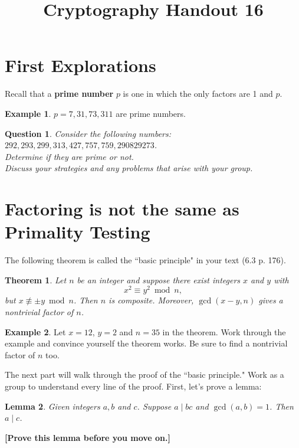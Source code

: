\documentclass[12pt]{amsart}
\makeatletter
\def\subtitle#1{\gdef\@subtitle{#1}}
\def\@subtitle{}
\theoremstyle{plain}
\newtheorem{thm}{Theorem}
\newtheorem{lem}[thm]{Lemma}
\newtheorem{quest}{Question}
\theoremstyle{definition}
\newtheorem*{ex}{Example}
\theoremstyle{remark}
\makeatother
\begin{document}
\onehalfspacing

\title[]{Cryptography Handout 16}
\subtitle{Primality Testing}
\maketitle

\section{First Explorations}
Recall that a \textbf{prime number} $p$ is one in which the only factors are 1 and $p$.

\begin{ex}
$p = 7, 31, 73, 311$ are prime numbers.
\end{ex}

\begin{quest}
Consider the following numbers: $292, 293, 299, 313, 427, 757, 759, 290829273$.\\
Determine if they are prime or not.\\
Discuss your strategies and any problems that arise with your group.
\end{quest}


\newpage \section{Factoring is not the same as Primality Testing}
\noindent The following theorem is called the ``basic principle" in your text (6.3 p. 176).
\begin{thm}
Let $n$ be an integer and suppose there exist integers $x$ and $y$ with $$x^2 \equiv y^2 \bmod n,$$ but $x \not\equiv \pm y \bmod n$.  Then $n$ is composite.  Moreover, $\gcd(x-y,n)$ gives a nontrivial factor of $n$.
\end{thm}

\begin{ex}
Let $x = 12$, $y = 2$ and $n = 35$ in the theorem.  Work through the example and convince yourself the theorem works.  Be sure to find a nontrivial factor of $n$ too.\\ \vspace{2in}
\end{ex}

The next part will walk through the proof of the ``basic principle."  Work as a group to understand every line of the proof.  First, let's prove a lemma:

\begin{lem}
Given integers $a, b$ and $c$.  Suppose $a \mid bc$ and $\gcd(a,b) = 1$.  Then $a \mid c$. 
\end{lem}
\textbf{[Prove this lemma before you move on.]}\\ \vspace{2.5in}
\end{document}

